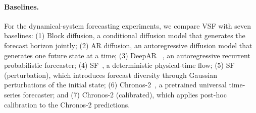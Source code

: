 \documentclass{article} %
\numberwithin{equation}{section}
\begin{document}
\paragraph{Baselines.}
For the dynamical-system forecasting experiments, we compare VSF with seven
baselines: (1) Block diffusion, a conditional diffusion model that generates
the forecast horizon jointly; (2) AR diffusion, an autoregressive diffusion
model that generates one future state at a time; (3) DeepAR
~\citep{salinas2020deepar}, an autoregressive recurrent probabilistic
forecaster; (4) SF~\citep{jiang2025streaming}, a deterministic
physical-time flow; (5) SF (perturbation), which introduces
forecast diversity through Gaussian perturbations of the initial state; (6)
Chronos-2~\citep{ansari2025chronos}, a pretrained universal time-series
forecaster; and (7) Chronos-2 (calibrated), which applies post-hoc calibration
to the Chronos-2 predictions.
\end{document}
